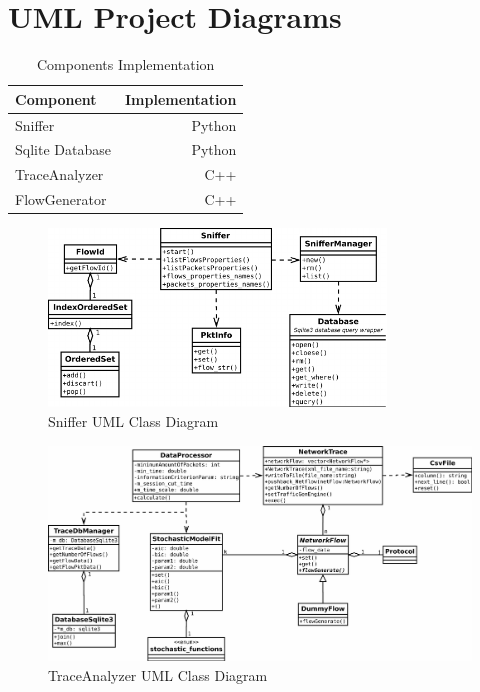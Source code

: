 \chapter{UML Project Diagrams}\label{ap:uml}

\begin{table}[ht!]
	\centering
	\caption{Components Implementation}
	\label{tab:components-implementation}
	\begin{tabular}{l r}
		\toprule
		\textbf{Component} & \textbf{Implementation}\\
		\midrule
		Sniffer			& Python \\
		Sqlite Database	& Python \\
		TraceAnalyzer	& C++ \\
		FlowGenerator	& C++ \\
		\bottomrule
	\end{tabular}
\end{table}




\begin{figure}[h]
	\centering
	\includegraphics[width=0.8\textwidth]{figures/apD/sniffer}
	\caption{Sniffer UML Class Diagram}
	\label{fig:uml-sniffer}
\end{figure}


\begin{figure}[]
	\centering
	\begin{turn}{90}
	\includegraphics[width=1.5\textwidth]{figures/apD/trace-analyzer}
	\end{turn}
	\caption{TraceAnalyzer UML Class Diagram}
	\label{fig:uml-trace-analyzer}
\end{figure}


